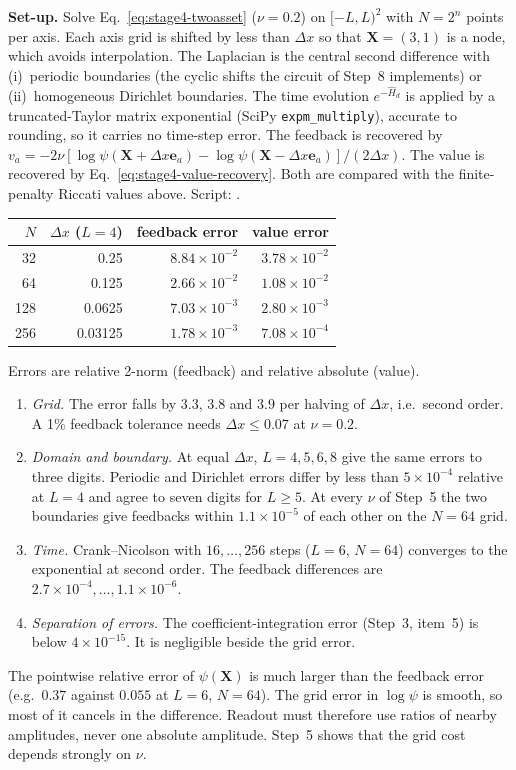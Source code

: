 \textbf{Set-up.} Solve Eq.~\eqref{eq:stage4-twoasset} ($\nu=0.2$) on
$[-L,L)^2$ with $N=2^n$ points per axis. Each axis grid is shifted by
less than $\Delta x$ so that $\mathbf X=(3,1)$ is a node, which avoids
interpolation. The Laplacian is the central second difference with
(i)~periodic boundaries (the cyclic shifts the circuit of Step~8
implements) or (ii)~homogeneous Dirichlet boundaries. The time evolution
$e^{-\hat H_d}$ is applied by a truncated-Taylor matrix exponential
(SciPy \texttt{expm\_multiply}), accurate to rounding, so it carries no
time-step error. The feedback is recovered by
$v_a=-2\nu[\log\psi(\mathbf X+\Delta x\mathbf e_a)
-\log\psi(\mathbf X-\Delta x\mathbf e_a)]/(2\Delta x)$. The value is
recovered by Eq.~\eqref{eq:stage4-value-recovery}. Both are compared with
the finite-penalty Riccati values above. Script:
.
\begin{center}
\begin{tabular}{@{}rrrr@{}}
\toprule
$N$ & $\Delta x$ ($L=4$) & feedback error & value error\\
\midrule
32 & 0.25 & $8.84\times10^{-2}$ & $3.78\times10^{-2}$\\
64 & 0.125 & $2.66\times10^{-2}$ & $1.08\times10^{-2}$\\
128 & 0.0625 & $7.03\times10^{-3}$ & $2.80\times10^{-3}$\\
256 & 0.03125 & $1.78\times10^{-3}$ & $7.08\times10^{-4}$\\
\bottomrule
\end{tabular}
\end{center}
Errors are relative 2-norm (feedback) and relative absolute (value).
\begin{enumerate}
\item \emph{Grid.} The error falls by $3.3$, $3.8$ and $3.9$ per halving
of $\Delta x$, i.e.\ second order. A 1\% feedback tolerance needs
$\Delta x\le0.07$ at $\nu=0.2$.
\item \emph{Domain and boundary.} At equal $\Delta x$, $L=4,5,6,8$ give
the same errors to three digits. Periodic and Dirichlet errors differ by
less than $5\times10^{-4}$ relative at $L=4$ and agree to seven digits for
$L\ge5$. At every $\nu$ of Step~5 the two boundaries give feedbacks within
$1.1\times10^{-5}$ of each other on the $N=64$ grid.
\item \emph{Time.} Crank--Nicolson with $16,\dots,256$ steps ($L=6$,
$N=64$) converges to the exponential at second order. The feedback
differences are $2.7\times10^{-4},\dots,1.1\times10^{-6}$.
\item \emph{Separation of errors.} The coefficient-integration error
(Step~3, item~5) is below $4\times10^{-15}$. It is negligible beside the
grid error.
\end{enumerate}
The pointwise relative error of $\psi(\mathbf X)$ is much larger than the
feedback error (e.g.\ $0.37$ against $0.055$ at $L=6$, $N=64$). The grid
error in $\log\psi$ is smooth, so most of it cancels in the difference.
Readout must therefore use ratios of nearby amplitudes, never one
absolute amplitude. Step~5 shows that the grid cost depends strongly
on $\nu$.

